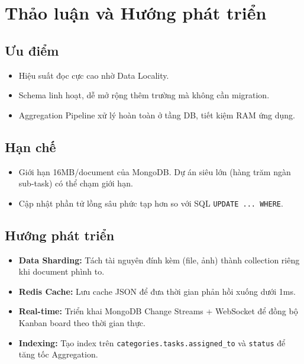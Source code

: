 \documentclass[a4paper,12pt]{article}
\begin{document}
\section{Thảo luận và Hướng phát triển}
\subsection{Ưu điểm}
\begin{itemize}
    \item Hiệu suất đọc cực cao nhờ Data Locality.
    \item Schema linh hoạt, dễ mở rộng thêm trường mà không cần migration.
    \item Aggregation Pipeline xử lý hoàn toàn ở tầng DB, tiết kiệm RAM ứng dụng.
\end{itemize}

\subsection{Hạn chế}
\begin{itemize}
    \item Giới hạn 16MB/document của MongoDB. Dự án siêu lớn (hàng trăm ngàn sub-task) có thể chạm giới hạn.
    \item Cập nhật phần tử lồng sâu phức tạp hơn so với SQL \texttt{UPDATE ... WHERE}.
\end{itemize}

\subsection{Hướng phát triển}
\begin{itemize}
    \item \textbf{Data Sharding:} Tách tài nguyên đính kèm (file, ảnh) thành collection riêng khi document phình to.
    \item \textbf{Redis Cache:} Lưu cache JSON để đưa thời gian phản hồi xuống dưới 1ms.
    \item \textbf{Real-time:} Triển khai MongoDB Change Streams + WebSocket để đồng bộ Kanban board theo thời gian thực.
    \item \textbf{Indexing:} Tạo index trên \texttt{categories.tasks.assigned\_to} và \texttt{status} để tăng tốc Aggregation.
\end{itemize}
\end{document}
